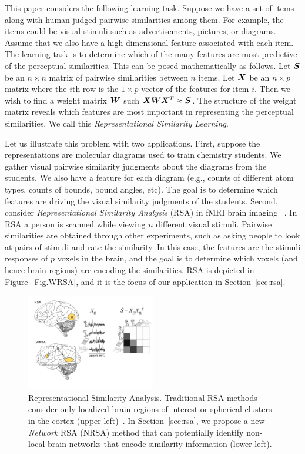 This paper considers the following learning task. Suppose we have a set of items along
with human-judged pairwise similarities among them.  For example, the items could be
visual stimuli such as advertisements, pictures, or diagrams.  Assume that we also have a
high-dimensional feature associated with each item.  The learning task is to determine
which of the many features are most predictive of the perceptual similarities.  This can
be posed mathematically as follows.  Let $\boldsymbol{S}$ be an $n\times n$ matrix of pairwise
similarities between $n$ items.  Let $\boldsymbol{X}$ be an $n\times p$ matrix where the $i$th row is
the $1\times p$ vector of the features for item $i$.  Then we wish to find a weight matrix
$\boldsymbol{W}$ such $\boldsymbol{X}\boldsymbol{W}\boldsymbol{X}^T \approx \boldsymbol{S}$.  The structure of the weight matrix reveals which
features are most important in representing the perceptual similarities. We call this {\em
  Representational Similarity Learning}.

Let us illustrate this problem with two applications.  First, suppose the representations
are molecular diagrams used to train chemistry students.  We gather visual pairwise
similarity judgments about the diagrams from the students.  We also have a feature for
each diagram (e.g., counts of different atom types, counts of bounds, bound angles, etc).
The goal is to determine which features are driving the visual similarity judgments of the
students.  Second, consider {\em Representational Similarity Analysis} (RSA) in fMRI brain
imaging ~\cite{RSA}.  In RSA a person is scanned while viewing $n$ different visual
stimuli.  Pairwise similarities are obtained through other experiments, such as asking
people to look at pairs of stimuli and rate the similarity. In this case, the features are
the stimuli responses of $p$ voxels in the brain, and the goal is to determine which
voxels (and hence brain regions) are encoding the similarities.  RSA is depicted in
Figure~\ref{Fig.WRSA}, and it is the focus of our application in Section~\ref{sec:rsa}.
\begin{figure}[!h]
	\centering
    \includegraphics[width=0.5\textwidth]{figures/WRSA.pdf}
    \caption{Representational Similarity Analysis. Traditional RSA methods consider only
    localized brain regions of interest or spherical clusters in the cortex (upper
    left)~\cite{RSA,searchlight}.  In Section~\ref{sec:rsa}, we propose a new {\em
    Network} RSA (NRSA) method that can potentially identify non-local brain networks
    that encode similarity information (lower left). }
    \label{Fig:WRSA}
\end{figure}

